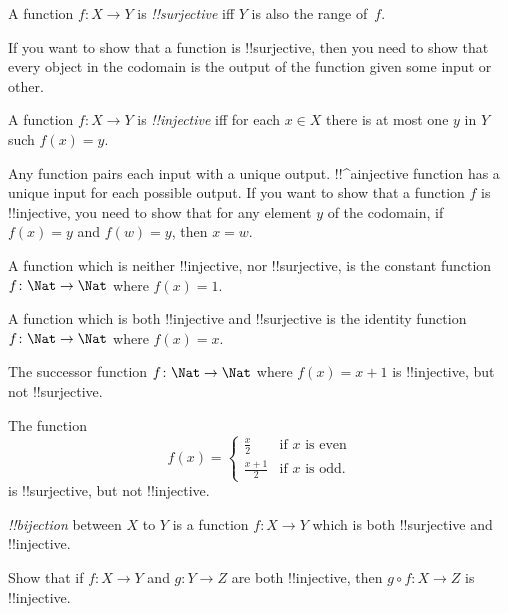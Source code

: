 \documentclass[../../include/open-logic-section]{subfiles}
\begin{document}

\begin{defn}
A function $f \colon X \rightarrow Y$ is \emph{!!{surjective}} iff $Y$ is also
the range of~$f$.
\end{defn}

\begin{explain}
If you want to show that a function is !!{surjective}, then you need
to show that every object in the codomain is the output of the
function given some input or other.
\end{explain}

\begin{defn}
A function $f \colon X \rightarrow Y$ is \emph{!!{injective}} iff for
each $x \in X$ there is at most one $y$ in $Y$ such $f(x) = y$.
\end{defn}

\begin{explain}
Any function pairs each input with a unique output. !!^a{injective} function has a unique input for each possible output. If you want to show that a function $f$ is !!{injective}, you need to show that for any element $y$ of the codomain, if $f(x)=y$ and $f(w)=y$, then $x=w$.

A function which is neither !!{injective}, nor !!{surjective}, is the constant function $f\colon \Nat \rightarrow \Nat$ where $f(x) = 1$.
    
A function which is both !!{injective} and !!{surjective} is the identity function $f\colon \Nat \rightarrow \Nat$ where $f(x) = x$.

The successor function $f \colon \Nat \rightarrow \Nat$ where $f(x) = x+1$ is !!{injective}, but not !!{surjective}.

The function 
\[
f(x) = 
\begin{cases}
  \frac{x}{2} & \text{if $x$ is even} \\
  \frac{x+1}{2} & \text{if $x$ is odd.}
\end{cases}
\]
is !!{surjective}, but not !!{injective}.

\end{explain}

\begin{defn}
 \emph{!!{bijection}} between $X$ to $Y$ is a
function $f \colon X \rightarrow Y$ which is both !!{surjective} and
!!{injective}.
\end{defn}

\begin{prob}
Show that if $f \colon X \to Y$ and $g \colon Y \to Z$ are both
!!{injective}, then $g \circ f \colon X \to Z$ is !!{injective}.
\end{prob}
\end{document}
